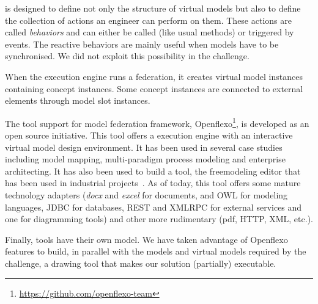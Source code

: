 \FML is designed to define not only the structure of virtual models but
also to define the collection of actions an engineer can perform on
them. These actions are called \emph{behaviors} and can either be called (like usual methods) or triggered by events. The reactive behaviors are mainly useful when models have to be synchronised. We did not
exploit this possibility in the challenge.


When the \FML execution engine runs a federation, it creates virtual
model instances containing concept instances. Some concept instances
are connected to external elements through model slot instances.


The tool support for model federation framework,
Openflexo\footnote{\url{https://github.com/openflexo-team}}, is
developed as an open source initiative. This tool offers a \FML
execution engine with an interactive virtual model design environment.
It has been used in several case studies including model mapping,
multi-paradigm process modeling and enterprise architecting. It has
also been used to build a tool, the freemodeling editor that has been
used in industrial projects~\cite{models2016-freemodel}. As of today, this tool
offers some mature technology adapters (\emph{docx} and \emph{excel}
for documents, \EMF and OWL for modeling languages, JDBC for databases,
REST and XMLRPC for external services and one for diagramming tools)
and other more rudimentary (pdf, HTTP, XML, etc.).

Finally, tools have their own model. We have taken advantage of
Openflexo features to build, in parallel with the models and virtual
models required by the challenge, a drawing tool that makes our
solution (partially) executable.

